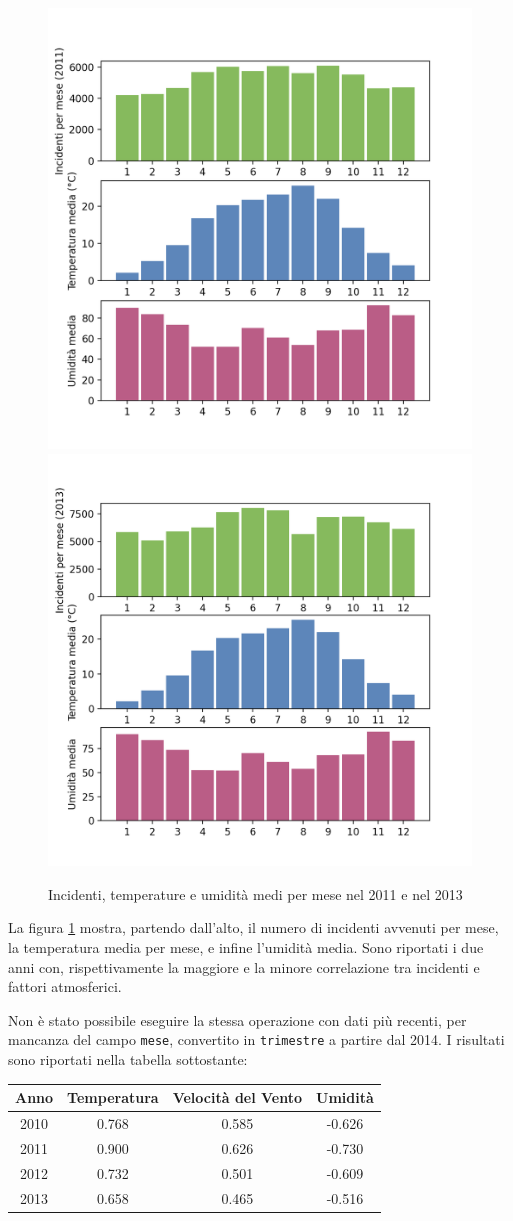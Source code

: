 \documentclass[a4paper,12pt]{report}
\newcommand{\columnstyle}[1]{\texttt{#1}}
\begin{document}
\begin{figure}
    \includegraphics[width=0.5\linewidth]{../src/meteo/temp_incidenti_2011.png}
    \includegraphics[width=0.5\linewidth]{../src/meteo/temp_incidenti_2013.png}
    \caption{Incidenti, temperature e umidità medi per mese nel 2011 e nel 2013}
    \label{fig:incidenti-temp}
\end{figure}

La figura \ref{fig:incidenti-temp} mostra, partendo dall'alto, il numero di incidenti 
avvenuti per mese, la temperatura media per mese, e infine l'umidità media.
Sono riportati i due anni con, rispettivamente la maggiore e la minore correlazione tra 
incidenti e fattori atmosferici.

Non è stato possibile eseguire la stessa operazione con dati più recenti, per mancanza del 
campo \columnstyle{mese}, convertito in \columnstyle{trimestre} a partire dal 2014.
I risultati sono riportati nella tabella sottostante: 

\begin{center}
    \def\arraystretch{1.5}%
    \begin{tabular}{ |c|c|c|c| } 
    \hline
    Anno & Temperatura & Velocità del Vento & Umidità \\ 
    \hline
    \rowcolor{TableGray}
    2010 & 0.768 & 0.585 & -0.626 \\
    2011 & 0.900 & 0.626 & -0.730 \\
    \rowcolor{TableGray}
    2012 & 0.732 & 0.501 & -0.609 \\
    2013 & 0.658 & 0.465 & -0.516 \\
    \hline
    \end{tabular}
\end{center}
\end{document}
